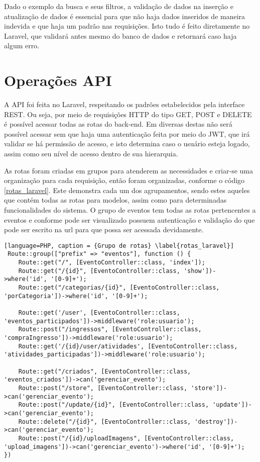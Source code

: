 Dado o exemplo da busca e seus filtros, a validação de dados na inserção e atualização de dados é essencial para que não haja dados inseridos de maneira indevida e que haja um padrão nas requisições. Isto tudo é feito diretamente no Laravel, que validará antes mesmo do banco de dados e retornará caso haja algum erro.

\section{Operações API}
A API foi feita no Laravel, respeitando os padrões estabelecidos pela interface REST. Ou seja, por meio de requisições HTTP do tipo GET, POST e DELETE é possível acessar todas as rotas do back-end. Em diversas destas não será possível acessar sem que haja uma autenticação feita por meio do JWT, que irá validar se há permissão de acesso, e isto determina caso o usuário esteja logado, assim como seu nível de acesso dentro de sua hierarquia. 

As rotas foram criadas em grupos para atenderem as necessidades e criar-se uma organização para cada requisição, então foram organizadas, conforme o código \ref{rotas_laravel}. Este demonstra cada um dos agrupamentos, sendo estes aqueles que contém todas as rotas para modelos, assim como para determinadas funcionalidades do sistema. O grupo de eventos tem todas as rotas pertencentes a eventos  e conforme pode ser visualizado possuem autenticação e validação do que pode ser escrito na url para que possa ser acessada devidamente. 

\begin{lstlisting}[language=PHP, caption = {Grupo de rotas} \label{rotas_laravel}]
 Route::group(["prefix" => "eventos"], function () {
    Route::get("/", [EventoController::class, 'index']);
    Route::get("/{id}", [EventoController::class, 'show'])->where('id', '[0-9]+');
    Route::get("/categorias/{id}", [EventoController::class, 'porCategoria'])->where('id', '[0-9]+');

    Route::get('/user', [EventoController::class, 'eventos_participados'])->middleware('role:usuario');
    Route::post("/ingressos", [EventoController::class, 'compraIngresso'])->middleware('role:usuario');
    Route::get('/{id}/user/atividades', [EventoController::class, 'atividades_participadas'])->middleware('role:usuario');

    Route::get("/criados", [EventoController::class, 'eventos_criados'])->can('gerenciar_evento');
    Route::post("/store", [EventoController::class, 'store'])->can('gerenciar_evento');
    Route::post("/update/{id}", [EventoController::class, 'update'])->can('gerenciar_evento');
    Route::delete("/{id}", [EventoController::class, 'destroy'])->can('gerenciar_evento');
    Route::post("/{id}/uploadImagens", [EventoController::class, 'upload_imagens'])->can('gerenciar_evento')->where('id', '[0-9]+');
})
\end{lstlisting}

